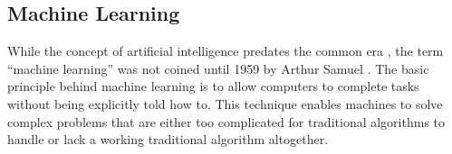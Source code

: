 \documentclass[letterpaper]{article}
\begin{document}
\subsection{Machine Learning}
While the concept of artificial intelligence predates the common era \cite{mccorduck04}, the term ``machine learning'' was not coined until 1959 by Arthur Samuel \cite{samuel59}. The basic principle behind machine learning is to allow computers to complete tasks without being explicitly told how to. This technique enables machines to solve complex problems that are either too complicated for traditional algorithms to handle or lack a working traditional algorithm altogether.

\printbibliography
\end{document}
